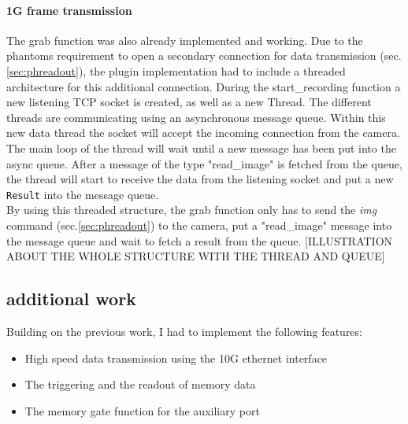\paragraph{1G frame transmission}
The grab function was also already implemented and working. Due to the phantoms requirement to open a secondary connection for data transmission (sec.\ref{sec:phreadout}), the plugin implementation had to include a threaded architecture for this additional connection. During the start\_recording function a new listening TCP socket is created, as well as a new Thread. The different threads are communicating using an asynchronous message queue. Within this new data thread the socket will accept the incoming connection from the camera. The main loop of the thread will wait until a new message has been put into the async queue. After a message of the type "read\_image" is fetched from the queue, the thread will start to receive the data from the listening socket and put a new \texttt{Result} into the message queue.\\
By using this threaded structure, the grab function only has to send the \textit{img} command (sec.\ref{sec:phreadout}) to the camera, put a "read\_image" message into the message queue and wait to fetch a result from the queue.
[ILLUSTRATION ABOUT THE WHOLE STRUCTURE WITH THE THREAD AND QUEUE]

\subsection{additional work}
Building on the previous work, I had to implement the following features:
\begin{itemize}
\item High speed data transmission using the 10G ethernet interface
\item The triggering and the readout of memory data
\item The memory gate function for the auxiliary port
\end{itemize}

